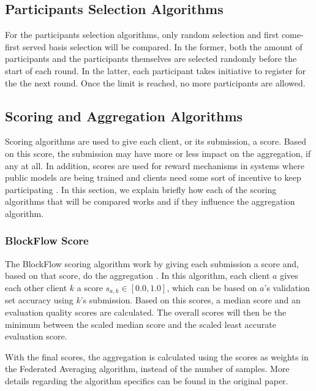 \subsection{Participants Selection Algorithms}

For the participants selection algorithms, only random selection and first come-first served basis selection will be compared. In the former, both the amount of participants and the participants themselves are selected randomly before the start of each round. In the latter, each participant takes initiative to register for the the next round. Once the limit is reached, no more participants are allowed.

\subsection{Scoring and Aggregation Algorithms}
\label{background:scoring}

Scoring algorithms are used to give each client, or its submission, a score. Based on this score, the submission may have more or less impact on the aggregation, if any at all. In addition, scores are used for reward mechanisms in systems where public models are being trained and clients need some sort of incentive to keep participating \cite{8945913, 8832210, 8905038, 9006344}. In this section, we explain briefly how each of the scoring algorithms that will be compared works and if they influence the aggregation algorithm.

\subsubsection{BlockFlow Score}

The BlockFlow scoring algorithm work by giving each submission a score and, based on that score, do the aggregation \cite{10.48550/arxiv.2007.03856}. In this algorithm, each client $a$ gives each other client $k$ a score $s_{a,k} \in [0.0, 1.0]$, which can be based on $a$'s validation set accuracy using $k$'s submission. Based on this scores, a median score and an evaluation quality scores are calculated. The overall scores will then be the minimum between the scaled median score and the scaled least accurate evaluation score.

With the final scores, the aggregation is calculated using the scores as weights in the Federated Averaging algorithm, instead of the number of samples. More details regarding the algorithm specifics can be found in the original paper.

